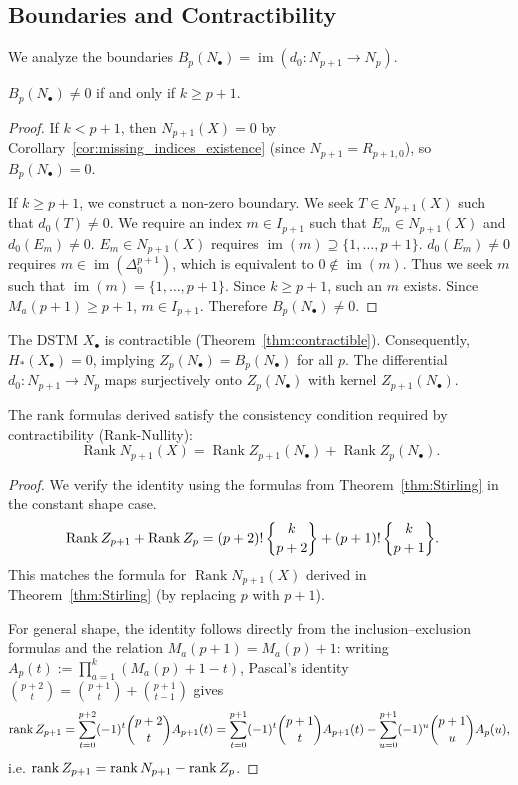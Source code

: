 \subsection{Boundaries and Contractibility}

We analyze the boundaries $B_p(N_\bullet) = \operatorname{im}(d_0: N_{p+1} \to N_p)$.

\begin{proposition}\label{prop:Bn}
$B_p(N_\bullet)\ne 0$ if and only if $k\ge p+1$.
\end{proposition}

\begin{proof}
If $k < p+1$, then $N_{p+1}(X)=0$ by Corollary~\ref{cor:missing_indices_existence} (since $N_{p+1}=R_{p+1,0}$), so $B_p(N_\bullet)=0$.

If $k\ge p+1$, we construct a non-zero boundary. We seek $T \in N_{p+1}(X)$ such that $d_0(T) \ne 0$.
We require an index $m\in I_{p+1}$ such that $E_m \in N_{p+1}(X)$ and $d_0(E_m) \ne 0$.
$E_m \in N_{p+1}(X)$ requires $\operatorname{im}(m) \supseteq \{1, \dots, p+1\}$.
$d_0(E_m) \ne 0$ requires $m \in \operatorname{im}(\Delta_0^{p+1})$, which is equivalent to $0 \notin \operatorname{im}(m)$.
Thus we seek $m$ such that $\operatorname{im}(m)=\{1,\dots,p+1\}$. Since $k\ge p+1$, such an $m$ exists. Since $M_a(p+1) \ge p+1$, $m \in I_{p+1}$.
Therefore $B_p(N_\bullet) \ne 0$.
\end{proof}

The DSTM $X_\bullet$ is contractible (Theorem~\ref{thm:contractible}). Consequently, $H_*(X_\bullet)=0$, implying $Z_p(N_\bullet) = B_p(N_\bullet)$ for all $p$. The differential $d_0: N_{p+1} \to N_p$ maps surjectively onto $Z_p(N_\bullet)$ with kernel $Z_{p+1}(N_\bullet)$.

\begin{proposition}
The rank formulas derived satisfy the consistency condition required by contractibility (Rank-Nullity):
\[
\operatorname{Rank} N_{p+1}(X) = \operatorname{Rank} Z_{p+1}(N_\bullet) + \operatorname{Rank} Z_p(N_\bullet).
\]
\end{proposition}
\begin{proof}
We verify the identity using the formulas from Theorem~\ref{thm:Stirling} in the constant shape case.
\begin{align*}
\operatorname{Rank} Z_{p+1} + \operatorname{Rank} Z_p &= (p+2)!\,\StirlingII{k}{p+2} + (p+1)!\,\StirlingII{k}{p+1}.
\end{align*}
This matches the formula for $\operatorname{Rank} N_{p+1}(X)$ derived in Theorem~\ref{thm:Stirling} (by replacing $p$ with $p+1$). 


For general shape, the identity follows directly from the inclusion--exclusion formulas and the relation
$M_a(p+1)=M_a(p)+1$: writing $A_p(t):=\prod_{a=1}^k(M_a(p)+1-t)$, Pascal's identity
$\binom{p+2}{t}=\binom{p+1}{t}+\binom{p+1}{t-1}$ gives
\[
\operatorname{rank} Z_{p+1}=\sum_{t=0}^{p+2}(-1)^t\binom{p+2}{t}A_{p+1}(t)
=\sum_{t=0}^{p+1}(-1)^t\binom{p+1}{t}A_{p+1}(t)-\sum_{u=0}^{p+1}(-1)^u\binom{p+1}{u}A_p(u),
\]
i.e. $\operatorname{rank} Z_{p+1}=\operatorname{rank} N_{p+1}-\operatorname{rank} Z_p$.
\end{proof}
